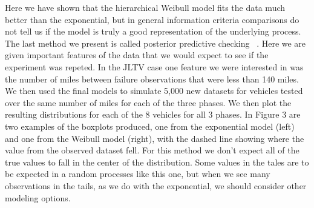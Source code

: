\documentclass[12pt]{article}
\begin{document}
Here we have shown that the hierarchical Weibull model fits the data much better
than the exponential, but in general information criteria comparisons do not
tell us if the model is truly a good representation of the underlying process.
The last method we present is called posterior predictive checking ~\cite{ref3}.
Here we are given important features of the data that we would expect to see if
the experiment was repeted.  In the JLTV case one feature we were interested in
was the number of miles between failure observations that were less than 140
miles.  We then used the final models to simulate 5,000 new datasets for
vehicles tested over the same number of miles for each of the three phases. We
then plot the resulting distributions for each of the 8 vehicles for all 3
phases.  In Figure 3 are two examples of the boxplots produced, one from the
exponential model (left) and one from the Weibull model (right), with the dashed
line showing where the value from the observed dataset fell.  For this method we
don’t expect all of the true values to fall in the center of the distribution.
Some values in the tales are to be expected in a random processes like this one,
but when we see many observations in the tails, as we do with the exponential,
we should consider other modeling options.
\end{document}
